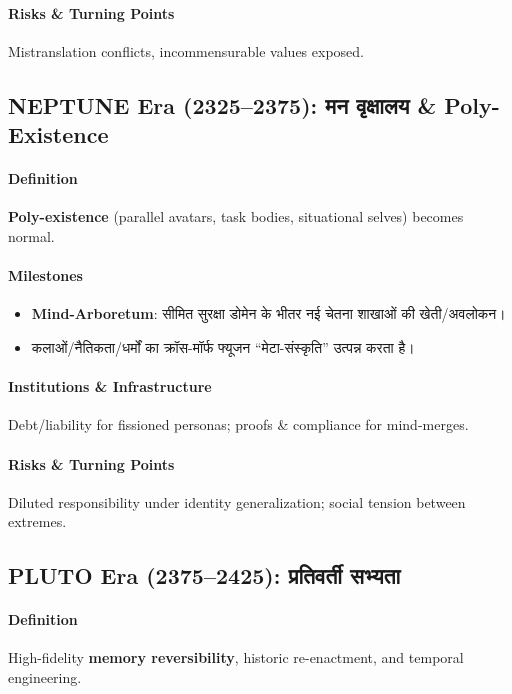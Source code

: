 \documentclass[11pt]{article}
\begin{document}
\begin{itemize}[noitemsep]
\begin{itemize}[noitemsep]
\begin{itemize}[noitemsep]
\begin{itemize}[noitemsep]
\begin{itemize}[noitemsep]
\begin{itemize}[noitemsep]
\paragraph{Risks \& Turning Points} Mistranslation conflicts, incommensurable values exposed.

\subsection{NEPTUNE Era (2325–2375): मन वृक्षालय \& Poly-Existence}
\paragraph{Definition} \textbf{Poly-existence} (parallel avatars, task bodies, situational selves) becomes normal.

\paragraph{Milestones}
\begin{itemize}[noitemsep]
  \item \textbf{Mind-Arboretum}: सीमित सुरक्षा डोमेन के भीतर नई चेतना शाखाओं की खेती/अवलोकन।
  \item कलाओं/नैतिकता/धर्मों का क्रॉस-मॉर्फ फ्यूजन ``मेटा-संस्कृति'' उत्पन्न करता है।
\end{itemize}

\paragraph{Institutions \& Infrastructure} Debt/liability for fissioned personas; proofs \& compliance for mind-merges.

\paragraph{Risks \& Turning Points} Diluted responsibility under identity generalization; social tension between extremes.

\subsection{PLUTO Era (2375–2425): प्रतिवर्ती सभ्यता}
\paragraph{Definition} High-fidelity \textbf{memory reversibility}, historic re-enactment, and temporal engineering.


\end{itemize}
\end{itemize}
\end{itemize}
\end{itemize}
\end{itemize}
\end{itemize}
\end{document}
